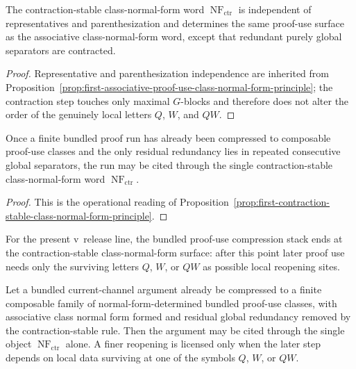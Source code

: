 \begin{proposition}
\label{prop:first-contraction-stable-class-normal-form-principle}
The contraction-stable class-normal-form word $\operatorname{NF}_{\mathrm{ctr}}$ is independent of representatives and parenthesization and determines the same proof-use surface as the associative class-normal-form word, except that redundant purely global separators are contracted.
\end{proposition}

\begin{proof}
Representative and parenthesization independence are inherited from Proposition~\ref{prop:first-associative-proof-use-class-normal-form-principle}; the contraction step touches only maximal $G$-blocks and therefore does not alter the order of the genuinely local letters $Q$, $W$, and $QW$.
\end{proof}

\begin{corollary}
\label{cor:use-rule-for-the-first-contraction-stable-class-normal-form-principle}
Once a finite bundled proof run has already been compressed to composable proof-use classes and the only residual redundancy lies in repeated consecutive global separators, the run may be cited through the single contraction-stable class-normal-form word $\operatorname{NF}_{\mathrm{ctr}}$.
\end{corollary}

\begin{proof}
This is the operational reading of Proposition~\ref{prop:first-contraction-stable-class-normal-form-principle}.
\end{proof}

\begin{remark}
\label{rem:status-of-the-terminal-proof-use-surface-in-the-present-v319-line}
For the present v\docversion\ release line, the bundled proof-use compression stack ends at the contraction-stable class-normal-form surface: after this point later proof use needs only the surviving letters $Q$, $W$, or $QW$ as possible local reopening sites.
\end{remark}

\begin{proposition}
\label{prop:terminal-citation-rule-for-the-present-v319-compression-line}
Let a bundled current-channel argument already be compressed to a finite composable family of normal-form-determined bundled proof-use classes, with associative class normal form formed and residual global redundancy removed by the contraction-stable rule. Then the argument may be cited through the single object $\operatorname{NF}_{\mathrm{ctr}}$ alone. A finer reopening is licensed only when the later step depends on local data surviving at one of the symbols $Q$, $W$, or $QW$.
\end{proposition}

